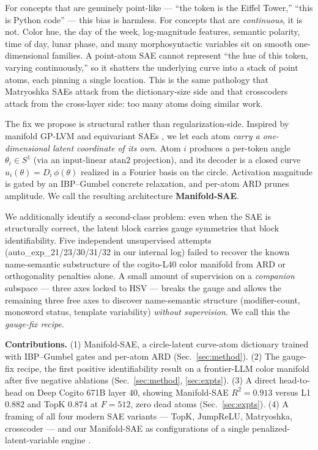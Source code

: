 \documentclass[10pt,twocolumn]{article}
\begin{document}
For concepts that are genuinely point-like --- ``the token is the Eiffel Tower,''
``this is Python code'' --- this bias is harmless. For concepts that are
\emph{continuous}, it is not. Color hue, the day of the week, log-magnitude
features, semantic polarity, time of day, lunar phase, and many morphosyntactic
variables sit on smooth one-dimensional families. A point-atom SAE cannot
represent ``the hue of this token, varying continuously,'' so it shatters
\cite{mendel2025feature} the underlying curve into a stack of point atoms, each
pinning a single location. This is the same pathology that Matryoshka SAEs
\cite{bussmann2025feature} attack from the dictionary-size side and that
crosscoders \cite{lindsey2024crosscoders} attack from the cross-layer side: too
many atoms doing similar work.

The fix we propose is structural rather than regularization-side. Inspired by
manifold GP-LVM \cite{lawrence2004gplvm,jensen2020mgplvm} and equivariant SAEs
\cite{khemlani2024equivariant}, we let each atom \emph{carry a one-dimensional
latent coordinate of its own}. Atom $i$ produces a per-token angle $\theta_i \in
S^1$ (via an input-linear $\mathrm{atan2}$ projection), and its decoder is a
closed curve $u_i(\theta) = D_i \, \phi(\theta)$ realized in a Fourier basis on
the circle. Activation magnitude is gated by an IBP--Gumbel concrete
\cite{griffiths2011ibp,jang2017categorical} relaxation, and per-atom ARD
\cite{neal1996bayesian,tipping1999ppca} prunes amplitude. We call the resulting
architecture \textbf{Manifold-SAE}.

We additionally identify a second-class problem: even when the SAE is structurally
correct, the latent block carries gauge symmetries that block identifiability.
Five independent unsupervised attempts (auto\_exp\_21/23/30/31/32 in our internal
log) failed to recover the known name-semantic substructure of the cogito-L40
color manifold from ARD or orthogonality penalties alone. A small amount of
supervision on a \emph{companion} subspace --- three axes locked to HSV --- breaks
the gauge and allows the remaining three free axes to discover name-semantic
structure (modifier-count, monoword status, template variability) \emph{without
supervision}. We call this the \emph{gauge-fix recipe}.

\textbf{Contributions.} (1) Manifold-SAE, a circle-latent curve-atom dictionary
trained with IBP--Gumbel gates and per-atom ARD (Sec.~\ref{sec:method}). (2) The
gauge-fix recipe, the first positive identifiability result on a frontier-LLM
color manifold after five negative ablations (Sec.~\ref{sec:method},
\ref{sec:expts}). (3) A direct head-to-head on Deep Cogito 671B layer 40,
showing Manifold-SAE $R^2{=}0.913$ versus L1 $0.882$ and TopK $0.874$ at
$F{=}512$, zero dead atoms (Sec.~\ref{sec:expts}). (4) A framing of all four
modern SAE variants --- TopK, JumpReLU, Matryoshka, crosscoder --- and our
Manifold-SAE as configurations of a single penalized-latent-variable engine
\cite{wood2017gam,khemakhem2020ivae,boumal2020manopt}.
\end{document}
